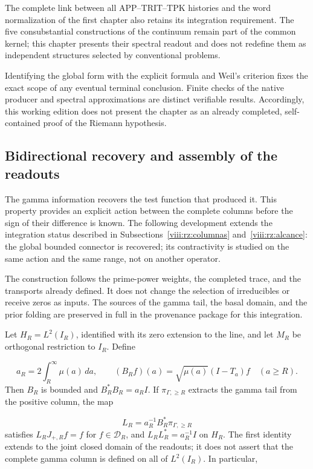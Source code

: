 The complete link between all APP–TRIT–TPK histories and the word normalization of the first chapter also retains its integration requirement. The five consubstantial constructions of the continuum remain part of the common kernel; this chapter presents their spectral readout and does not redefine them as independent structures selected by conventional problems.

Identifying the global form with the explicit formula and Weil's criterion fixes the exact scope of any eventual terminal conclusion. Finite checks of the native producer and spectral approximations are distinct verifiable results. Accordingly, this working edition does not present the chapter as an already completed, self-contained proof of the Riemann hypothesis.

\subsection{Bidirectional recovery and assembly of the readouts}
\label{viii:rz:gamma}
The gamma information recovers the test function that produced it. This property provides an explicit action between the complete columns before the sign of their difference is known. The following development extends the integration status described in Subsections~\ref{viii:rz:columnas} and~\ref{viii:rz:alcance}: the global bounded connector is recovered; its contractivity is studied on the same action and the same range, not on another operator.

The construction follows the prime-power weights, the completed trace, and the transports already defined. It does not change the selection of irreducibles or receive zeros as inputs. The sources of the gamma tail, the basal domain, and the prior folding are preserved in full in the provenance package for this integration.

Let \(H_R=L^2(I_R)\), identified with its zero extension to the line, and let \(M_R\) be orthogonal restriction to \(I_R\). Define

\[
a_R=2\int_R^\infty\mu(a)\,da,\qquad
(B_Rf)(a)=\sqrt{\mu(a)}(I-T_a)f\quad(a\geq R).
\]
Then \(B_R\) is bounded and \(B_R^*B_R=a_RI\). If \(\pi_{\Gamma,\geq R}\) extracts the gamma tail from the positive column, the map

\[
L_R=a_R^{-1}B_R^*\pi_{\Gamma,\geq R}
\]
satisfies \(L_RJ_{+,R}f=f\) for \(f\in\mathcal D_R\), and \(L_RL_R^*=a_R^{-1}I\) on \(H_R\). The first identity extends to the joint closed domain of the readouts; it does not assert that the complete gamma column is defined on all of \(L^2(I_R)\). In particular,

